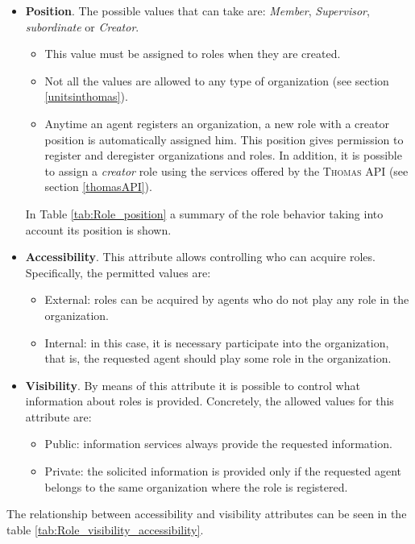 \begin{itemize}
\item \textbf{Position}. The possible values that can take are: \textit{Member}, \textit{Supervisor}, \textit{subordinate} or \textit{Creator}.
\begin{itemize}
\item This value must be assigned to roles when they are created.
\item Not all the values are allowed to any type of organization (see section \ref{unitsinthomas}).
\item Anytime an agent registers an organization, a new role with a creator position is automatically assigned him. This position gives permission to register and deregister organizations and roles. In addition, it is possible to assign a \textit{creator} role using the services offered by the \textsc{Thomas} API (see section \ref{thomasAPI}).
\end{itemize}

In Table \ref{tab:Role_position} a summary of the role behavior taking into account its position is shown.


\item \textbf{Accessibility}. This attribute allows controlling who can acquire roles. Specifically, the permitted values are:
\begin{itemize}
	\item External: roles can be acquired by agents who do not play any role in the organization.
	\item Internal: in this case, it is necessary participate into the organization, that is, the requested agent should play some role  in the organization.
\end{itemize}


\item \textbf{Visibility}. By means of this attribute it is possible to control what information about roles is provided. Concretely, the allowed values for this attribute are:
\begin{itemize}
\item Public: information services always provide the requested information.
\item Private: the solicited information is provided only if the requested  agent belongs to the same organization where the role is registered.
\end{itemize}

\end{itemize}

 The relationship between accessibility and visibility attributes  can be seen in the table \ref{tab:Role_visibility_accessibility}.


